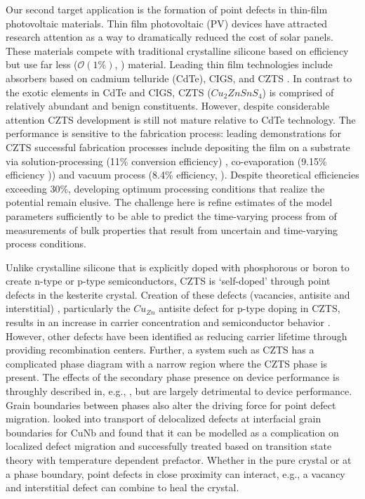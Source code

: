 \documentclass[11pt]{article}
\newcommand{\MarginPar}[1]{\marginpar{%
\vskip-\baselineskip %
\raggedright\tiny\sffamily
\hrule\smallskip{\color{red}#1}\par\smallskip\hrule}}
\begin{document}
Our second target application 
is the formation of point defects in thin-film photovoltaic
materials. 
\MarginPar{inserted ray's stuff on pd.  needs considerable cleanup here}
Thin film photovoltaic (PV) devices have attracted research attention
as a way to dramatically reduced the cost of solar panels. These
materials compete with traditional crystalline silicone based on
efficiency but use far less ($\mathcal{O}(1\%)$, \cite{find})
material. Leading thin film technologies include absorbers based on
cadmium telluride (CdTe), CIGS, and CZTS \cite{JiangY13}. In contrast
to the exotic elements in CdTe and CIGS, CZTS ($Cu_2ZnSnS_4$) is
comprised of relatively abundant and benign constituents. However,
despite considerable attention CZTS development is still not mature
relative to CdTe technology. The performance is sensitive to the
fabrication process: leading demonstrations for CZTS successful
fabrication processes include depositing the film on a substrate via
solution-processing (11\% conversion efficiency) \cite{Todorov13},
co-evaporation (9.15\% efficiency \cite{Repins12})) and vacuum
process (8.4\% efficiency, \cite{Shin11}). Despite theoretical
efficiencies exceeding 30\%, developing optimum processing conditions
that realize the potential remain elusive.
The challenge here is
refine estimates of the model parameters
sufficiently to be able to predict the time-varying process
from of measurements of bulk
properties that result from uncertain and time-varying process
conditions.

Unlike crystalline silicone that is explicitly doped with
phosphorous or boron to create n-type or p-type semiconductors, CZTS
is `self-doped' through point defects in the kesterite
crystal. Creation of these defects (vacancies, antisite and
interstitial) , particularly the $Cu_{Zn}$ antisite defect for
p-type doping in CZTS, results in an increase in carrier
concentration and semiconductor behavior \cite{JiangY13}.  However,
other defects have been identified as reducing carrier lifetime
through providing recombination centers. Further, a system such as
CZTS has a complicated phase diagram with a narrow region where the
CZTS phase is present. The effects of the secondary phase presence
on device performance is throughly described in, e.g.,
\cite{Flammersberger}, but are largely detrimental to device
performance. Grain boundaries between phases also alter the driving
force for point defect migration. \cite{Kolluri12} looked into
transport of delocalized defects at interfacial grain boundaries for
CuNb and found that it can be modelled as a complication on
localized defect migration and successfully treated based on
transition state theory with temperature dependent
prefactor. Whether in the pure crystal or at a phase boundary, point
defects in close proximity can interact, e.g., a vacancy and
interstitial defect can combine to heal the crystal. 
\end{document}
